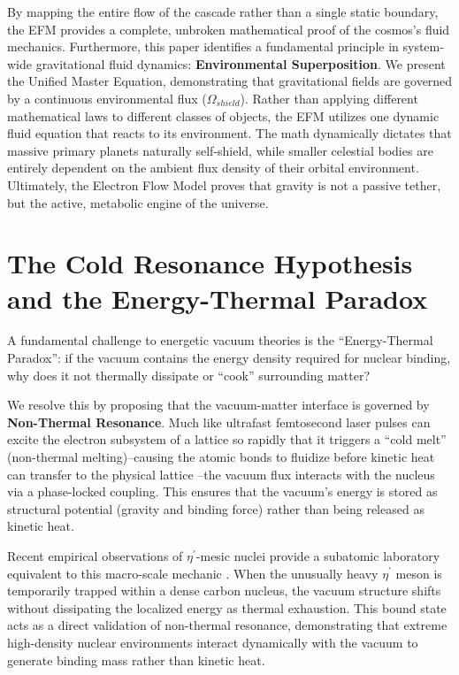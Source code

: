 \documentclass[11pt, a4paper]{article}
\begin{document}
  By mapping the entire flow of the cascade rather than a single static boundary, the EFM provides a complete, unbroken mathematical proof of the cosmos's fluid mechanics. Furthermore, this paper identifies a fundamental principle in system-wide gravitational fluid dynamics: \textbf{Environmental Superposition}. We present the Unified Master Equation, demonstrating that gravitational fields are governed by a continuous environmental flux ($\Omega_{shield}$). Rather than applying different mathematical laws to different classes of objects, the EFM utilizes one dynamic fluid equation that reacts to its environment. The math dynamically dictates that massive primary planets naturally self-shield, while smaller celestial bodies are entirely dependent on the ambient flux density of their orbital environment. Ultimately, the Electron Flow Model proves that gravity is not a passive tether, but the active, metabolic engine of the universe.

\section{The Cold Resonance Hypothesis and the Energy-Thermal Paradox}
  A fundamental challenge to energetic vacuum theories is the ``Energy-Thermal Paradox'': if the vacuum contains the energy density required for nuclear binding, why does it not thermally dissipate or ``cook'' surrounding matter?

  We resolve this by proposing that the vacuum-matter interface is governed by \textbf{Non-Thermal Resonance}. Much like ultrafast femtosecond laser pulses can excite the electron subsystem of a lattice so rapidly that it triggers a ``cold melt'' (non-thermal melting)--causing the atomic bonds to fluidize before kinetic heat can transfer to the physical lattice \cite{rousse2001}--the vacuum flux interacts with the nucleus via a phase-locked coupling. This ensures that the vacuum's energy is stored as structural potential (gravity and binding force) rather than being released as kinetic heat.

  Recent empirical observations of $\eta^{\prime}$-mesic nuclei provide a subatomic laboratory equivalent to this macro-scale mechanic \cite{mesic2026}. When the unusually heavy $\eta^{\prime}$ meson is temporarily trapped within a dense carbon nucleus, the vacuum structure shifts without dissipating the localized energy as thermal exhaustion. This bound state acts as a direct validation of non-thermal resonance, demonstrating that extreme high-density nuclear environments interact dynamically with the vacuum to generate binding mass rather than kinetic heat.
\end{document}
